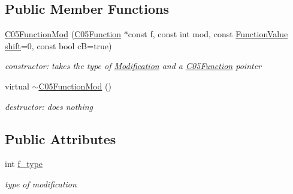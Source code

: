 \subsection*{Public Member Functions}
\begin{DoxyCompactItemize}
\item 
\mbox{\hyperlink{class_s_m_spp__di__unipi__it_1_1_c05_function_mod_a1a8a83daf78ff6c3f2a3f7ff378e0112}{C05\+Function\+Mod}} (\mbox{\hyperlink{class_s_m_spp__di__unipi__it_1_1_c05_function}{C05\+Function}} $\ast$const f, const int mod, const \mbox{\hyperlink{class_s_m_spp__di__unipi__it_1_1_function_mod_a44f54e31f9fa8a29194218c234876284}{Function\+Value}} \mbox{\hyperlink{class_s_m_spp__di__unipi__it_1_1_function_mod_a177a0111cf0d0fdc5409df06c3b5e282}{shift}}=0, const bool cB=true)
\begin{DoxyCompactList}\small\item\em constructor\+: takes the type of \mbox{\hyperlink{class_s_m_spp__di__unipi__it_1_1_modification}{Modification}} and a \mbox{\hyperlink{class_s_m_spp__di__unipi__it_1_1_c05_function}{C05\+Function}} pointer \end{DoxyCompactList}\item 
\mbox{\label{class_s_m_spp__di__unipi__it_1_1_c05_function_mod_ac2fea69cf30671fbbcef539d7528a9d3}} 
virtual \mbox{\hyperlink{class_s_m_spp__di__unipi__it_1_1_c05_function_mod_ac2fea69cf30671fbbcef539d7528a9d3}{$\sim$\+C05\+Function\+Mod}} ()
\begin{DoxyCompactList}\small\item\em destructor\+: does nothing \end{DoxyCompactList}\end{DoxyCompactItemize}
\subsection*{Public Attributes}
\begin{DoxyCompactItemize}
\item 
\mbox{\label{class_s_m_spp__di__unipi__it_1_1_c05_function_mod_a102e30a031044d9e821316a075e882b1}} 
int \mbox{\hyperlink{class_s_m_spp__di__unipi__it_1_1_c05_function_mod_a102e30a031044d9e821316a075e882b1}{f\+\_\+type}}
\begin{DoxyCompactList}\small\item\em type of modification \end{DoxyCompactList}\end{DoxyCompactItemize}
